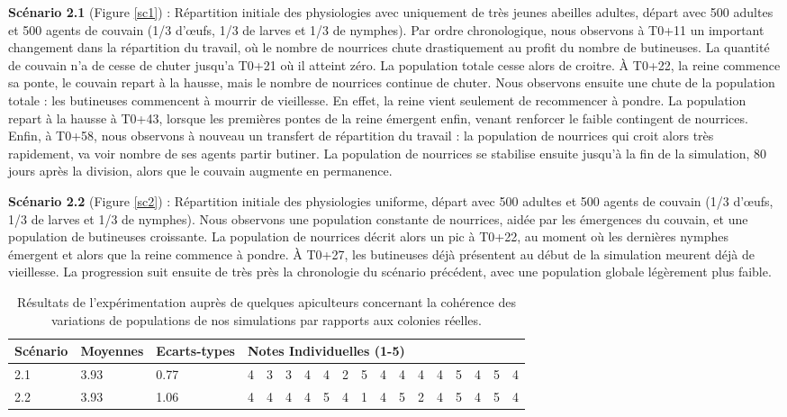 		\textbf{Scénario 2.1} (Figure \ref{sc1}) : Répartition initiale des physiologies avec uniquement de très jeunes abeilles adultes, départ avec 500 adultes et 500 agents de couvain (1/3 d'œufs, 1/3 de larves et 1/3 de nymphes). Par ordre chronologique, nous observons à T0+11 un important changement dans la répartition du travail, où le nombre de nourrices chute drastiquement au profit du nombre de butineuses. La quantité de couvain n'a de cesse de chuter jusqu'a T0+21 où il atteint zéro. La population totale cesse alors de croitre. À T0+22, la reine commence sa ponte, le couvain repart à la hausse, mais le nombre de nourrices continue de chuter. Nous observons ensuite une chute de la population totale : les butineuses commencent à mourrir de vieillesse. En effet, la reine vient seulement de recommencer à pondre. La population repart à la hausse à T0+43, lorsque les premières pontes de la reine émergent enfin, venant renforcer le faible contingent de nourrices. Enfin, à T0+58, nous observons à nouveau un transfert de répartition du travail : la population de nourrices qui croit alors très rapidement, va voir nombre de ses agents partir butiner. La population de nourrices se stabilise ensuite jusqu'à la fin de la simulation, 80 jours après la division, alors que le couvain augmente en permanence.
		
		\textbf{Scénario 2.2} (Figure \ref{sc2}) : Répartition initiale des physiologies uniforme, départ avec 500 adultes et 500 agents de couvain (1/3 d'œufs, 1/3 de larves et 1/3 de nymphes). Nous observons une population constante de nourrices, aidée par les émergences du couvain, et une population de butineuses croissante. La population de nourrices décrit alors un pic à T0+22, au moment où les dernières nymphes émergent et alors que la reine commence à pondre. À T0+27, les butineuses déjà présentent au début de la simulation meurent déjà de vieillesse. La progression suit ensuite de très près la chronologie du scénario précédent, avec une population globale légèrement plus faible.
	
	
	\begin{table}
	\centering
	\begin{tabular}{l|l|l|lllllllllllllll}
	Scénario & Moyennes & Ecarts-types & \multicolumn{15}{l}{Notes Individuelles (1-5)}\\
	\hline
	2.1 & 3.93 & 0.77 &4&3&3&4&4&2&5&4&4&4&4&5&4&5&4\\
	2.2 & 3.93 & 1.06 &4&4&4&4&5&4&1&4&5&2&4&5&4&5&4\\	
	\end{tabular}
	\caption{Résultats de l'expérimentation auprès de quelques apiculteurs concernant la cohérence des variations de populations de nos simulations par rapports aux colonies réelles.}
	\label{TabResCoherence}
	\end{table}
	
